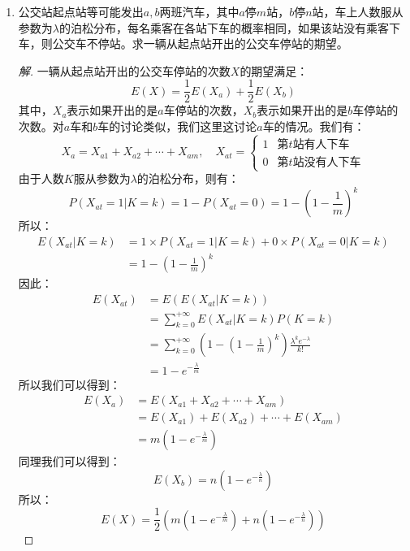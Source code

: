 \documentclass[12pt]{article}
\newcommand{\hei}{\CJKfamily{hei}}                          %
\begin{document}
\begin{enumerate}
\item {\hei 公交站起点站等可能发出$a,b$两班汽车，其中$a$停$m$站，$b$停$n$站，车上人数服从参数为$\lambda$的泊松分布，每名乘客在各站下车的概率相同，如果该站没有乘客下车，则公交车不停站。求一辆从起点站开出的公交车停站的期望。}
\begin{proof}[解]
	一辆从起点站开出的公交车停站的次数$X$的期望满足：
	\begin{equation}
	E(X)=\frac{1}{2}E(X_a)+\frac{1}{2}E(X_b)
	\end{equation}
	其中，$X_a$表示如果开出的是$a$车停站的次数，$X_b$表示如果开出的是$b$车停站的次数。对$a$车和$b$车的讨论类似，我们这里这讨论$a$车的情况。我们有：
	\begin{equation}
	X_a=X_{a1}+X_{a2}+\cdots+X_{am},\quad X_{at}=\left\{
	\begin{array}{cc}
	1 & \mbox{第$t$站有人下车}\\
	0 & \mbox{第$t$站没有人下车}
	\end{array}
	\right.
	\end{equation}
	由于人数$K$服从参数为$\lambda$的泊松分布，则有：
	\begin{equation}
	P(X_{at}=1|K=k)=1-P(X_{at}=0)=1-\left(1-\frac{1}{m}\right)^k
	\end{equation}
	所以：
	\begin{equation}
	\begin{aligned}
	E(X_{at}|K=k)&=1\times P(X_{at}=1|K=k)+0\times P(X_{at}=0|K=k) \\
	&=1-\left(1-\frac{1}{m}\right)^k
	\end{aligned}
	\end{equation}
	因此：
	\begin{equation}
	\begin{aligned}
	E(X_{at})&=E(E(X_{at}|K=k)) \\
	&=\sum_{k=0}^{+\infty}E(X_{at}|K=k)P(K=k) \\
	&=\sum_{k=0}^{+\infty}\left(1-\left(1-\frac{1}{m}\right)^k\right)\frac{\lambda^ke^{-\lambda}}{k!} \\
	&=1-e^{-\frac{\lambda}{m}}
	\end{aligned}
	\end{equation}
	所以我们可以得到：
	\begin{equation}
	\begin{aligned}
	E(X_a)&=E(X_{a1}+X_{a2}+\cdots+X_{am}) \\
	&=E(X_{a1})+E(X_{a2})+\cdots+E(X_{am}) \\
	&=m\left(1-e^{-\frac{\lambda}{m}}\right)
	\end{aligned}
	\end{equation}
	同理我们可以得到：
	\begin{equation}
	E(X_b)=n\left(1-e^{-\frac{\lambda}{n}}\right)
	\end{equation}
	所以：
	\begin{equation}
	E(X)=\frac{1}{2}\left(m\left(1-e^{-\frac{\lambda}{m}}\right)+n\left(1-e^{-\frac{\lambda}{n}}\right)\right)
	\end{equation}
\end{proof}


\end{enumerate}
\end{document}
